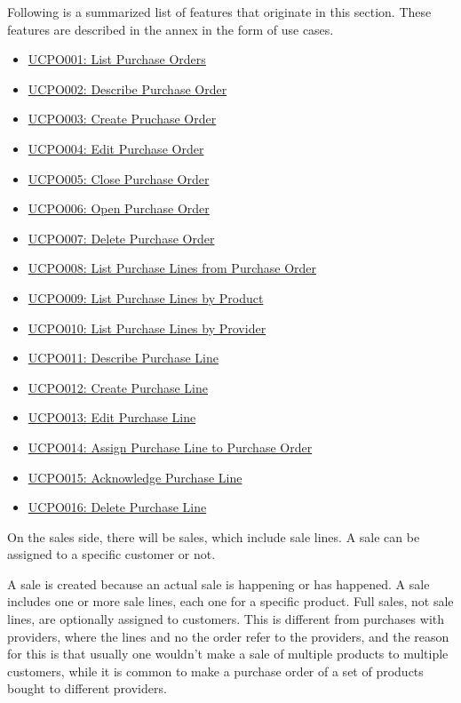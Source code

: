 Following is a summarized list of features that originate in this section. These features are described in the annex in the form of use cases.
\hfill\break
\begin{itemize}
\item \hyperref[UCPO001]{UCPO001: List Purchase Orders}
\item \hyperref[UCPO002]{UCPO002: Describe Purchase Order}
\item \hyperref[UCPO003]{UCPO003: Create Pruchase Order}
\item \hyperref[UCPO004]{UCPO004: Edit Purchase Order}
\item \hyperref[UCPO005]{UCPO005: Close Purchase Order}
\item \hyperref[UCPO006]{UCPO006: Open Purchase Order}
\item \hyperref[UCPO007]{UCPO007: Delete Purchase Order}
\item \hyperref[UCPO008]{UCPO008: List Purchase Lines from Purchase Order}
\item \hyperref[UCPO009]{UCPO009: List Purchase Lines by Product}
\item \hyperref[UCPO010]{UCPO010: List Purchase Lines by Provider}
\item \hyperref[UCPO011]{UCPO011: Describe Purchase Line}
\item \hyperref[UCPO012]{UCPO012: Create Purchase Line}
\item \hyperref[UCPO013]{UCPO013: Edit Purchase Line}
\item \hyperref[UCPO014]{UCPO014: Assign Purchase Line to Purchase Order}
\item \hyperref[UCPO015]{UCPO015: Acknowledge Purchase Line}
\item \hyperref[UCPO016]{UCPO016: Delete Purchase Line}
\end{itemize}
\hfill\break
On the sales side, there will be sales, which include sale lines. A sale can be assigned to a specific customer or not.

A sale is created because an actual sale is happening or has happened. A sale includes one or more sale lines, each one for a specific product. Full sales, not sale lines, are optionally assigned to customers. This is different from purchases with providers, where the lines and no the order refer to the providers, and the reason for this is that usually one wouldn’t make a sale of multiple products to multiple customers, while it is common to make a purchase order of a set of products bought to different providers.

